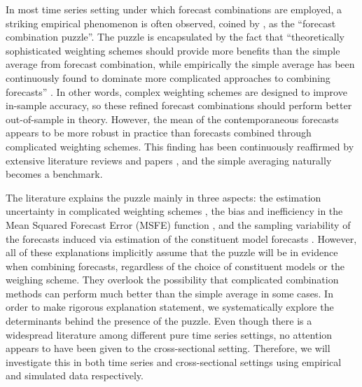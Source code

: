 \documentclass{monashthesis}
\begin{document}
In most time series setting under which forecast combinations are employed, a striking empirical phenomenon is often observed, coined by \textcite{SW04}, as the ``forecast combination puzzle''. The puzzle is encapsulated by the fact that ``theoretically sophisticated weighting schemes should provide more benefits than the simple average from forecast combination, while empirically the simple average has been continuously found to dominate more complicated approaches to combining forecasts'' \autocite{WHLK22}. In other words, complex weighting schemes are designed to improve in-sample accuracy, so these refined forecast combinations should perform better out-of-sample in theory. However, the mean of the contemporaneous forecasts appears to be more robust in practice than forecasts combined through complicated weighting schemes. This finding has been continuously reaffirmed by extensive literature reviews and papers \autocites[e.g.,][]{MACF82,C89,MSA18,MSA20}, and the simple averaging naturally becomes a benchmark.

The literature explains the puzzle mainly in three aspects: the estimation uncertainty in complicated weighting schemes \autocite{SW98,SW04,SW09}, the bias and inefficiency in the Mean Squared Forecast Error (MSFE) function \autocite{E11,CMVW16}, and the sampling variability of the forecasts induced via estimation of the constituent model forecasts \autocite{ZMFP22,FZMP23}. However, all of these explanations implicitly assume that the puzzle will be in evidence when combining forecasts, regardless of the choice of constituent models or the weighing scheme. They overlook the possibility that complicated combination methods can perform much better than the simple average in some cases. In order to make rigorous explanation statement, we systematically explore the determinants behind the presence of the puzzle. Even though there is a widespread literature among different pure time series settings, no attention appears to have been given to the cross-sectional setting. Therefore, we will investigate this in both time series and cross-sectional settings using empirical and simulated data respectively.
\end{document}
